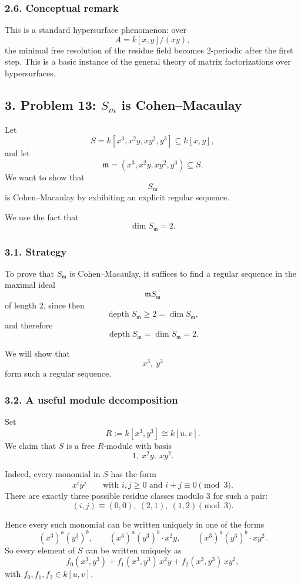 \documentclass[12pt,a4paper]{article}
\theoremstyle{notespace}
\DeclareMathOperator{\depth}{depth}
\begin{document}
\subsubsection{2.6. Conceptual remark}

This is a standard hypersurface phenomenon: over
\[
A=k[x,y]/(xy),
\]
the minimal free resolution of the residue field becomes \(2\)-periodic after the first step. This is a basic instance of the general theory of matrix factorizations over hypersurfaces.

\subsection{3. Problem 13: \(S_m\) is Cohen--Macaulay}

Let
\[
S=k[x^3,x^2y,xy^2,y^3]\subseteq k[x,y],
\]
and let
\[
\mathfrak m=(x^3,x^2y,xy^2,y^3)\subseteq S.
\]
We want to show that
\[
S_{\mathfrak m}
\]
is Cohen--Macaulay by exhibiting an explicit regular sequence.

We use the fact that
\[
\dim S_{\mathfrak m}=2.
\]

\subsubsection{3.1. Strategy}

To prove that \(S_{\mathfrak m}\) is Cohen--Macaulay, it suffices to find a regular sequence in the maximal ideal
\[
\mathfrak m S_{\mathfrak m}
\]
of length \(2\), since then
\[
\depth S_{\mathfrak m}\ge 2=\dim S_{\mathfrak m},
\]
and therefore
\[
\depth S_{\mathfrak m}=\dim S_{\mathfrak m}=2.
\]

We will show that
\[
x^3,\ y^3
\]
form such a regular sequence.

\subsubsection{3.2. A useful module decomposition}

Set
\[
R:=k[x^3,y^3]\cong k[u,v].
\]
We claim that \(S\) is a free \(R\)-module with basis
\[
1,\ x^2y,\ xy^2.
\]

Indeed, every monomial in \(S\) has the form
\[
x^i y^j
\qquad \text{with } i,j\ge 0 \text{ and } i+j\equiv 0\pmod 3.
\]
There are exactly three possible residue classes modulo \(3\) for such a pair:
\[
(i,j)\equiv (0,0),\ (2,1),\ (1,2)\pmod 3.
\]

Hence every such monomial can be written uniquely in one of the forms
\[
(x^3)^a (y^3)^b,
\qquad
(x^3)^a (y^3)^b \cdot x^2y,
\qquad
(x^3)^a (y^3)^b \cdot xy^2.
\]
So every element of \(S\) can be written uniquely as
\[
f_0(x^3,y^3)+f_1(x^3,y^3)\,x^2y+f_2(x^3,y^3)\,xy^2,
\]
with \(f_0,f_1,f_2\in k[u,v]\).
\end{document}
